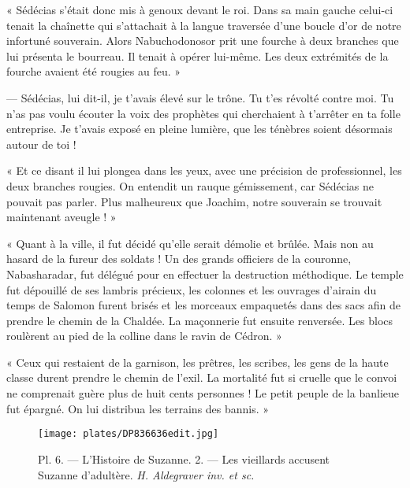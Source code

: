 \documentclass[a4paper, 11pt, oneside, polutonikogreek, french]{article}
\begin{document}
« Sédécias s'était donc mis à genoux devant le roi. Dans sa main gauche celui-ci tenait la chaînette qui s'attachait à la langue traversée d'une boucle d'or de notre infortuné souverain. Alors Nabuchodonosor prit une fourche à deux branches que lui présenta le bourreau. Il tenait à opérer lui-même. Les deux extrémités de la fourche avaient été rougies au feu. »

--- Sédécias, lui dit-il, je t'avais élevé sur le trône. Tu t'es révolté contre moi. Tu n'as pas voulu écouter la voix des prophètes qui cherchaient à t'arrêter en ta folle entreprise. Je t'avais exposé en pleine lumière, que les ténèbres soient désormais autour de toi !

« Et ce disant il lui plongea dans les yeux, avec une précision de professionnel, les deux branches rougies. On entendit un rauque gémissement, car Sédécias ne pouvait pas parler. Plus malheureux que Joachim, notre souverain se trouvait maintenant aveugle ! »

\bigskip
\centerline{\EightStarTaper}
\centerline{\EightStarTaper\EightStarTaper}
\bigskip

« Quant à la ville, il fut décidé qu'elle serait démolie et brûlée. Mais non au hasard de la fureur des soldats ! Un des grands officiers de la couronne, Nabasharadar, fut délégué pour en effectuer la destruction méthodique. Le temple fut dépouillé de ses lambris précieux, les colonnes et les ouvrages d'airain du temps de Salomon furent brisés et les morceaux empaquetés dans des sacs afin de prendre le chemin de la Chaldée. La maçonnerie fut ensuite renversée. Les blocs roulèrent au pied de la colline dans le ravin de Cédron. »

« Ceux qui restaient de la garnison, les prêtres, les scribes, les gens de la haute classe durent prendre le chemin de l'exil. La mortalité fut si cruelle que le convoi ne comprenait guère plus de huit cents personnes ! Le petit peuple de la banlieue fut épargné. On lui distribua les terrains des bannis. »

\bigskip
\centerline{\EightStarTaper}
\centerline{\EightStarTaper\EightStarTaper}
\bigskip
\clearpage
\vspace*{\fill}
\begin{figure}[H]
\centering
\texttt{[image: plates/DP836636edit.jpg]}
\caption{Pl. 6. --- L'Histoire de Suzanne. 2. --- Les vieillards accusent Suzanne d'adultère. \emph{H. Aldegraver inv. et sc.}}
\end{figure}
\vspace*{\fill}
\clearpage
\end{document}
